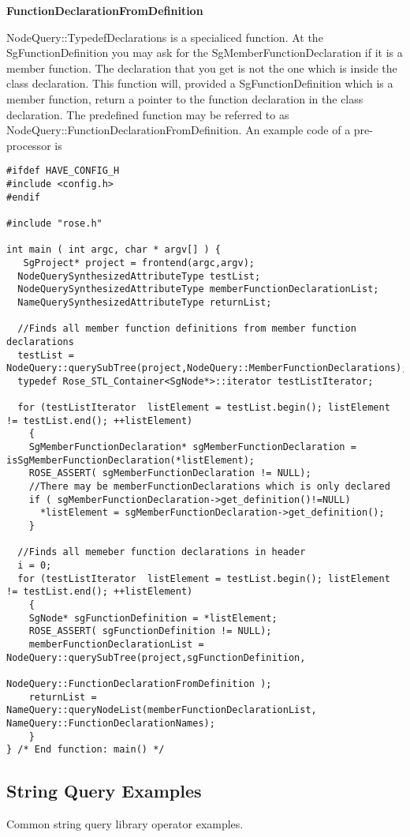 {\textbf{FunctionDeclarationFromDefinition}

NodeQuery::TypedefDeclarations is a specialiced function. At the
SgFunctionDefinition you may ask for the SgMemberFunctionDeclaration
if it is a member function. The declaration that you get is not the
one which is inside the class declaration. This function will,
provided a SgFunctionDefinition which is a member function, return a
pointer to the function declaration in the class declaration. The
predefined function may be referred to as
NodeQuery::FunctionDeclarationFromDefinition. An example code of a
pre-processor is
\begin{verbatim}
#ifdef HAVE_CONFIG_H
#include <config.h>
#endif

#include "rose.h"

int main ( int argc, char * argv[] ) {
   SgProject* project = frontend(argc,argv);
  NodeQuerySynthesizedAttributeType testList;
  NodeQuerySynthesizedAttributeType memberFunctionDeclarationList; 
  NameQuerySynthesizedAttributeType returnList;
 
  //Finds all member function definitions from member function declarations 
  testList = NodeQuery::querySubTree(project,NodeQuery::MemberFunctionDeclarations);
  typedef Rose_STL_Container<SgNode*>::iterator testListIterator;
  
  for (testListIterator  listElement = testList.begin(); listElement != testList.end(); ++listElement) 
    {
    SgMemberFunctionDeclaration* sgMemberFunctionDeclaration = isSgMemberFunctionDeclaration(*listElement);
    ROSE_ASSERT( sgMemberFunctionDeclaration != NULL);
    //There may be memberFunctionDeclarations which is only declared
    if ( sgMemberFunctionDeclaration->get_definition()!=NULL)
      *listElement = sgMemberFunctionDeclaration->get_definition();
    }

  //Finds all memeber function declarations in header 
  i = 0;
  for (testListIterator  listElement = testList.begin(); listElement != testList.end(); ++listElement) 
    {
    SgNode* sgFunctionDefinition = *listElement;
    ROSE_ASSERT( sgFunctionDefinition != NULL);
    memberFunctionDeclarationList = NodeQuery::querySubTree(project,sgFunctionDefinition, 
                                        NodeQuery::FunctionDeclarationFromDefinition );
    returnList = NameQuery::queryNodeList(memberFunctionDeclarationList, NameQuery::FunctionDeclarationNames);
    }
} /* End function: main() */
\end{verbatim}
 
\subsection{String Query Examples}
   Common string query library operator examples.



}
